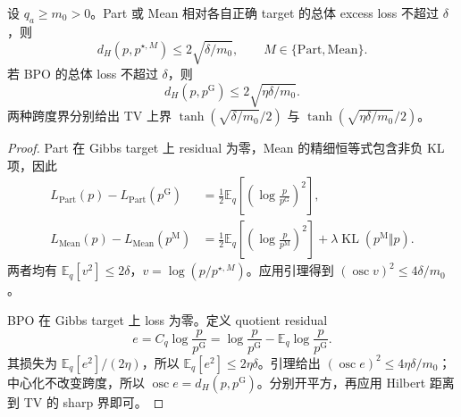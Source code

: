 \documentclass[lang=cn,scheme=chinese,openany]{../book/elegantbook}
\newcommand{\E}{\mathbb E}
\newcommand{\KL}{\operatorname{KL}}
\begin{document}
\begin{proposition}
\label{dyn:regression-gap}
设 $q_a\ge m_0>0$。Part 或 Mean 相对各自正确 target 的总体 excess loss 不超过 $\delta$，则
\begin{equation}
d_H(p,p^{\star,M})\le2\sqrt{\delta/m_0},
\qquad M\in\{\mathrm{Part},\mathrm{Mean}\}.
\end{equation}
若 BPO 的总体 loss 不超过 $\delta$，则
\begin{equation}
d_H(p,p^{\mathrm G})\le2\sqrt{\eta\delta/m_0}.
\end{equation}
两种跨度界分别给出 TV 上界 $\tanh(\sqrt{\delta/m_0}/2)$ 与 $\tanh(\sqrt{\eta\delta/m_0}/2)$。
\end{proposition}
\begin{proof}
Part 在 Gibbs target 上 residual 为零，Mean 的精细恒等式包含非负 KL 项，因此
\begin{align*}
L_{\mathrm{Part}}(p)-L_{\mathrm{Part}}(p^{\mathrm G})
&=\frac12\E_q\left[\left(\log\frac p{p^{\mathrm G}}\right)^2\right],\\
L_{\mathrm{Mean}}(p)-L_{\mathrm{Mean}}(p^{\mathrm M})
&=\frac12\E_q\left[\left(\log\frac p{p^{\mathrm M}}\right)^2\right]
+\lambda\KL(p^{\mathrm M}\Vert p).
\end{align*}
两者均有 $\E_q[v^2]\le2\delta$，$v=\log(p/p^{\star,M})$。应用引理得到 $(\operatorname{osc}v)^2\le4\delta/m_0$。

BPO 在 Gibbs target 上 loss 为零。定义 quotient residual
\begin{equation*}
e=C_q\log\frac p{p^{\mathrm G}}
=\log\frac p{p^{\mathrm G}}-\E_q\log\frac p{p^{\mathrm G}}.
\end{equation*}
其损失为 $\E_q[e^2]/(2\eta)$，所以 $\E_q[e^2]\le2\eta\delta$。引理给出 $(\operatorname{osc}e)^2\le4\eta\delta/m_0$；中心化不改变跨度，所以 $\operatorname{osc}e=d_H(p,p^{\mathrm G})$。分别开平方，再应用 Hilbert 距离到 TV 的 sharp 界即可。
\end{proof}
\end{document}
